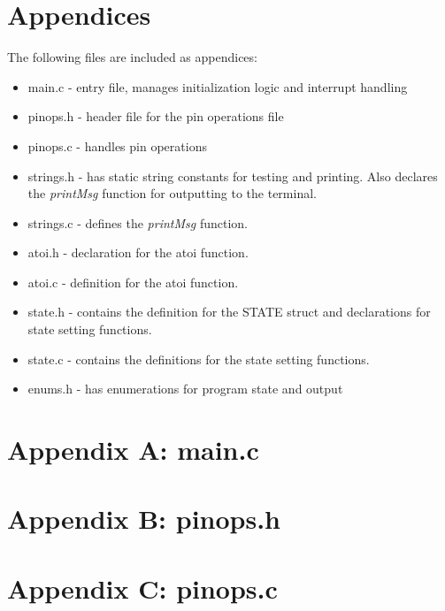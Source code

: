 \documentclass[letterpaper,11pt]{texMemo} %
\begin{document}
\section*{Appendices}
The following files are included as appendices:
\begin{itemize}
\item main.c - entry file, manages initialization logic and interrupt handling\\
\item pinops.h - header file for the pin operations file \\
\item pinops.c - handles pin operations\\
\item strings.h - has static string constants for testing and printing. Also declares the \textit{printMsg} function for outputting to the terminal.\\
\item strings.c - defines the \textit{printMsg} function.\\
\item atoi.h - declaration for the atoi function.\\
\item atoi.c - definition for the atoi function.\\
\item state.h - contains the definition for the STATE struct and declarations for state setting functions.
\item state.c - contains the definitions for the state setting functions.
\item enums.h - has enumerations for program state and output\\
\end{itemize}
\newpage

\section*{Appendix A: main.c}
\begin{tiny}

\end{tiny}
\newpage
\section*{Appendix B: pinops.h}
\begin{tiny}

\end{tiny}
\newpage
\section*{Appendix C: pinops.c}
\begin{tiny}

\end{tiny}
\newpage
\end{document}
